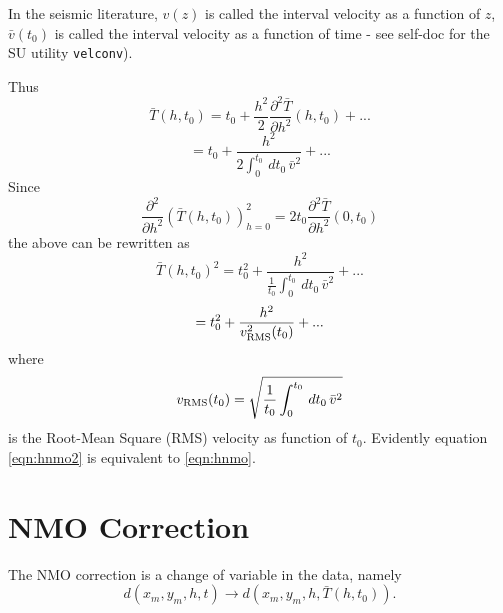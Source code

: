  In the seismic literature, $v(z)$ is called the interval velocity as a function of $z$, $\bar{v}(t_0)$ is called the interval velocity as a function of time - see self-doc for the SU utility {\tt velconv}).

Thus 
\[
\bar{T}(h,t_0)=t_0 + \frac{h^2}{2}\frac{\partial^2 \bar{T}}{\partial h^2}(h,t_0) +...
\]
\[
= t_0 + \frac{h^2}{2\int_0^{t_0}\,dt_0\,\bar{v}^2}+...
\]
Since
\[
\frac{\partial^2}{\partial h^2}(\bar{T}(h,t_0))^2_{h=0}=2 t_0\frac{\partial^2 \bar{T}}
{\partial h^2}(0,t_0)
\]
the above can be rewritten as
\[
\bar{T}(h,t_0)^2 = t_0^2 + \frac{h^2}{\frac{1}{t_0}\int_0^{t_0}\,dt_0\,\bar{v}^2}+...
\]
\begin{equation}
\label{eqn:hnmo2}
=t_0^2+\frac{h^2}{v_{\rm RMS}^2(t_0)} + ...
\end{equation}
where 
\begin{equation}
\label{eqn:vrmsdef}
v_{\rm RMS}(t_0) = \sqrt{\frac{1}{t_0}\int_0^{t_0}\,dt_0\,\bar{v}^2}
\end{equation}
is the Root-Mean Square (RMS) velocity as function of $t_0$. Evidently equation \ref{eqn:hnmo2} is equivalent to \ref{eqn:hnmo}.

\section{NMO Correction}
The NMO correction is a change of variable in the data, namely 
\begin{equation}
\label{eqn:nmo}
d(x_m,y_m,h,t) \rightarrow d(x_m,y_m,h,\bar{T}(h,t_0)).
\end{equation}

